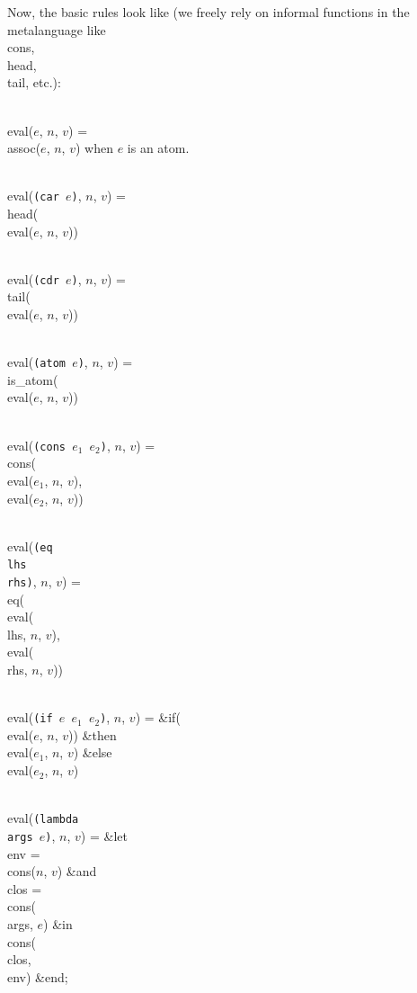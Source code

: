 \fi

Now, the basic rules look like (we freely rely on informal functions
in the metalanguage like \\{cons}, \\{head}, \\{tail}, etc.):

\bull
\\{eval}($e$, $n$, $v$) = \\{assoc}($e$, $n$, $v$) when $e$ is an atom.

\bull
\\{eval}({\tt (car $e$)}, $n$, $v$) = \\{head}(\\{eval}($e$, $n$, $v$))

\bull
\\{eval}({\tt (cdr $e$)}, $n$, $v$) = \\{tail}(\\{eval}($e$, $n$, $v$))

\bull
\\{eval}({\tt (atom $e$)}, $n$, $v$) = \\{is\_atom}(\\{eval}($e$, $n$, $v$))

\bull
\\{eval}({\tt (cons $e_{1}$ $e_{2}$)}, $n$, $v$) =
\\{cons}(\\{eval}($e_{1}$, $n$, $v$), \\{eval}($e_{2}$, $n$, $v$))

\bull
\\{eval}({\tt (eq \\{lhs} \\{rhs})}, $n$, $v$) =
\\{eq}(\\{eval}(\\{lhs}, $n$, $v$), \\{eval}(\\{rhs}, $n$, $v$))

\bull
\\{eval}({\tt (if $e$ $e_{1}$ $e_{2}$)}, $n$, $v$) =
\&{if}(\\{eval}($e$, $n$, $v$)) \&{then} \\{eval}($e_{1}$, $n$, $v$)
\&{else} \\{eval}($e_{2}$, $n$, $v$)

\bull
\\{eval}({\tt (lambda \\{args} $e$)}, $n$, $v$) = \&{let} \\{env} = %
\\{cons}($n$, $v$)
\&{and} \\{clos} = \\{cons}(\\{args}, $e$)
\&{in} \\{cons}(\\{clos}, \\{env}) \&{end};

